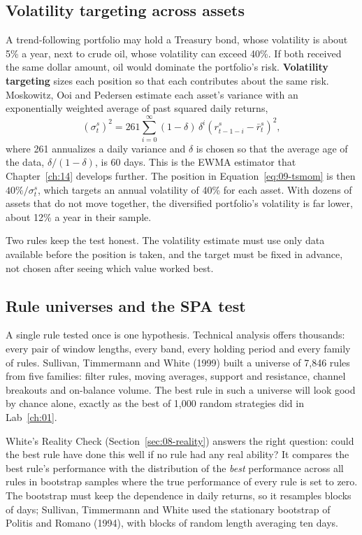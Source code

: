 \subsection{Volatility targeting across assets}

A trend-following portfolio may hold a Treasury bond, whose volatility is about 5\% a year, next to crude oil, whose volatility can exceed 40\%. If both received the same dollar amount, oil would dominate the portfolio's risk. \textbf{Volatility targeting} sizes each position so that each contributes about the same risk. Moskowitz, Ooi and Pedersen estimate each asset's variance with an exponentially weighted average of past squared daily returns,
\begin{equation}
  \left(\sigma^s_t\right)^2 = 261 \sum_{i=0}^{\infty} (1-\delta)\,\delta^i \left(r^s_{t-1-i} - \bar r^s_t\right)^2,
  \label{eq:09-ewma}
\end{equation}
where 261 annualizes a daily variance and $\delta$ is chosen so that the average age of the data, $\delta/(1-\delta)$, is 60 days. This is the EWMA estimator that Chapter~\ref{ch:14} develops further. The position in Equation~\eqref{eq:09-tsmom} is then $40\%/\sigma^s_t$, which targets an annual volatility of 40\% for each asset. With dozens of assets that do not move together, the diversified portfolio's volatility is far lower, about 12\% a year in their sample.

Two rules keep the test honest. The volatility estimate must use only data available before the position is taken, and the target must be fixed in advance, not chosen after seeing which value worked best.

\subsection{Rule universes and the SPA test}

A single rule tested once is one hypothesis. Technical analysis offers thousands: every pair of window lengths, every band, every holding period and every family of rules. Sullivan, Timmermann and White (1999) built a universe of 7,846 rules from five families: filter rules, moving averages, support and resistance, channel breakouts and on-balance volume. The best rule in such a universe will look good by chance alone, exactly as the best of 1,000 random strategies did in Lab~\ref{ch:01}.

White's Reality Check (Section~\ref{sec:08-reality}) answers the right question: could the best rule have done this well if no rule had any real ability? It compares the best rule's performance with the distribution of the \emph{best} performance across all rules in bootstrap samples where the true performance of every rule is set to zero. The bootstrap must keep the dependence in daily returns, so it resamples blocks of days; Sullivan, Timmermann and White used the stationary bootstrap of Politis and Romano (1994), with blocks of random length averaging ten days.


